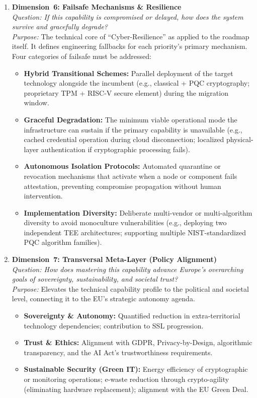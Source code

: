 \documentclass{ieeeaccess}
\begin{document}
\begin{enumerate}
    \item \textbf{Dimension~6: Failsafe Mechanisms \& Resilience}\\
    \textit{Question: If this capability is compromised or delayed, how does
    the system survive and gracefully degrade?}\\
    \textit{Purpose:} The technical core of ``Cyber-Resilience'' as applied
    to the roadmap itself. It defines engineering fallbacks for each priority's
    primary mechanism. Four categories of failsafe must be addressed:
    \begin{itemize}
        \item \textbf{Hybrid Transitional Schemes:} Parallel deployment of the
        target technology alongside the incumbent (e.g., classical + PQC
        cryptography; proprietary TPM + RISC-V secure element) during the
        migration window.
        \item \textbf{Graceful Degradation:} The minimum viable operational
        mode the infrastructure can sustain if the primary capability is
        unavailable (e.g., cached credential operation during cloud
        disconnection; localized physical-layer authentication if
        cryptographic processing fails).
        \item \textbf{Autonomous Isolation Protocols:} Automated quarantine
        or revocation mechanisms that activate when a node or component fails
        attestation, preventing compromise propagation without human
        intervention.
        \item \textbf{Implementation Diversity:} Deliberate multi-vendor or
        multi-algorithm diversity to avoid monoculture vulnerabilities (e.g.,
        deploying two independent TEE architectures; supporting multiple
        NIST-standardized PQC algorithm families).
    \end{itemize}

    \item \textbf{Dimension~7: Transversal Meta-Layer (Policy Alignment)}\\
    \textit{Question: How does mastering this capability advance Europe's
    overarching goals of sovereignty, sustainability, and societal trust?}\\
    \textit{Purpose:} Elevates the technical capability profile to the
    political and societal level, connecting it to the EU's strategic
    autonomy agenda.
    \begin{itemize}
        \item \textbf{Sovereignty \& Autonomy:} Quantified reduction in
        extra-territorial technology dependencies; contribution to SSL
        progression.
        \item \textbf{Trust \& Ethics:} Alignment with GDPR, Privacy-by-Design,
        algorithmic transparency, and the AI Act's trustworthiness requirements.
        \item \textbf{Sustainable Security (Green IT):} Energy efficiency
        of cryptographic or monitoring operations; e-waste reduction through
        crypto-agility (eliminating hardware replacement); alignment with the
        EU Green Deal.
    \end{itemize}


\end{enumerate}
\end{document}
